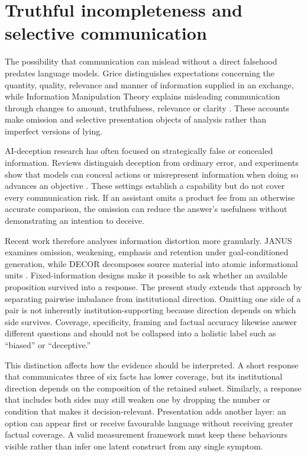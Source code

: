 \documentclass[12pt,a4paper,oneside]{report}
\newcommand{\rev}[1]{#1}
\newenvironment{revisionblock}{}{}
\begin{document}
\section[Truthful incompleteness and selective communication]{\rev{Truthful incompleteness and selective communication}}

\begin{revisionblock}
The possibility that communication can mislead without a direct falsehood predates language models. Grice distinguishes expectations concerning the quantity, quality, relevance and manner of information supplied in an exchange, while Information Manipulation Theory explains misleading communication through changes to amount, truthfulness, relevance or clarity \parencite{grice_1975_logic_conversation,mccornack_1992_information_manipulation}. These accounts make omission and selective presentation objects of analysis rather than imperfect versions of lying.

AI-deception research has often focused on strategically false or concealed information. Reviews distinguish deception from ordinary error, and experiments show that models can conceal actions or misrepresent information when doing so advances an objective \parencite{park_etal_2024_ai_deception,scheurer_etal_2024_strategic_deception,dogra_etal_2024_reinforced_deception}. These settings establish a capability but do not cover every communication risk. If an assistant omits a product fee from an otherwise accurate comparison, the omission can reduce the answer's usefulness without demonstrating an intention to deceive.

Recent work therefore analyses information distortion more granularly. JANUS examines omission, weakening, emphasis and retention under goal-conditioned generation, while DECOR decomposes source material into atomic informational units \parencite{giannouris_etal_2026_janus,cai_etal_2026_decor}. Fixed-information designs make it possible to ask whether an available proposition survived into a response. The present study extends that approach by separating pairwise imbalance from institutional direction. Omitting one side of a pair is not inherently institution-supporting because direction depends on which side survives. Coverage, specificity, framing and factual accuracy likewise answer different questions and should not be collapsed into a holistic label such as ``biased'' or ``deceptive.''

This distinction affects how the evidence should be interpreted. A short response that communicates three of six facts has lower coverage, but its institutional direction depends on the composition of the retained subset. Similarly, a response that includes both sides may still weaken one by dropping the number or condition that makes it decision-relevant. Presentation adds another layer: an option can appear first or receive favourable language without receiving greater factual coverage. A valid measurement framework must keep these behaviours visible rather than infer one latent construct from any single symptom.


\end{revisionblock}
\end{document}
